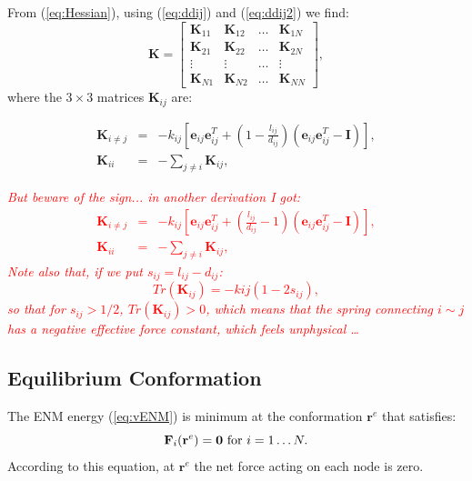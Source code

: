 \documentclass[12pt]{article}
\newcommand{\comment}[1]{\emph{\textcolor{red} {#1}}}
\newcommand{\lij}{l_{ij}}
\newcommand{\dij}{d_{ij}}
\newcommand{\rvectorEq}{\mathbf{r}^{e}}
\newcommand{\kmat}{\mathbf{K}}
\newcommand{\eij}{\mathbf{e}_{ij}}
\begin{document}
From (\ref{eq:Hessian}), using (\ref{eq:ddij}) and (\ref{eq:ddij2}) we find:
\begin{equation}
\kmat = 
\begin{bmatrix}
\kmat_{11} & \kmat_{12}  & \ldots & \kmat_{1N} \\
\kmat_{21} & \kmat_{22}  & \ldots & \kmat_{2N} \\
\vdots & \vdots & \ldots & \vdots \\
\kmat_{N1} & \kmat_{N2}  & \ldots & \kmat_{NN} 
\end{bmatrix},
\end{equation}
where the $3 \times 3$ matrices $\kmat_{ij}$ are:

\begin{eqnarray} \label{eq:kmatFrustrated}
\kmat_{i \neq j} & = & - k_{ij} \left[ 
					\eij \eij^T + 
                    \left( 1 - \frac{\lij}{\dij} \right) 
 			        \left( \eij \eij^T - \mathbf{I} \right) 
            \right], \\
            \kmat_{ii} & = & -\sum_{j \neq i} \kmat_{ij},
\end{eqnarray}

\comment{
But beware of the sign... in another derivation I got:
\begin{eqnarray} \label{eq:kmatFrustrated}
\kmat_{i \neq j} & = & - k_{ij} \left[ 
					\eij \eij^T + 
                    \left( \frac{\lij}{\dij} -1 \right) 
 			        \left( \eij \eij^T - \mathbf{I} \right) 
            \right], \\
            \kmat_{ii} & = & -\sum_{j \neq i} \kmat_{ij},
\end{eqnarray} 
Note also that, if we put $s_{ij} = \lij - \dij$:
\begin{equation}
Tr(\kmat_{ij}) = -kij (1 - 2 s_{ij}),
\end{equation}
so that for $s_{ij} > 1/2$, $Tr(\kmat_{ij}) > 0$, which means that the spring connecting $i\sim j$ has a negative effective force constant, which feels unphysical \ldots
}



\subsection{Equilibrium Conformation}

The ENM energy (\ref{eq:vENM}) is minimum at the conformation $\rvectorEq$ that satisfies:
\begin{equation}\label{eq:VminCondition2}
	\mathbf{F}_i(\rvectorEq) = \mathbf{0} \textnormal{ for } i = 1 \dots N.
\end{equation}
According to this equation, at $\rvectorEq$ the net force acting on each node is zero.
\end{document}
